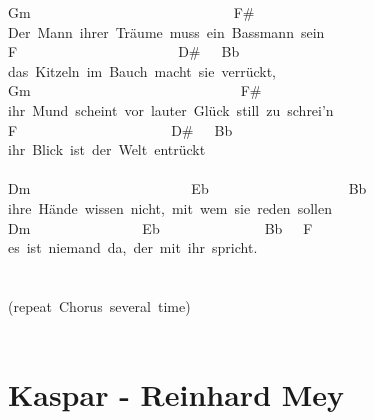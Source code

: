\documentclass[]{book}
\let\stdsection\section
\renewcommand\section{\clearpage\stdsection}
\begin{document}
Gm~~~~~~~~~~~~~~~~~~~~~~~~~~~~~F\#\\
Der~Mann~ihrer~Träume~muss~ein~Bassmann~sein\\
\hspace*{0.333em}\hspace*{0.333em}\hspace*{0.333em}\hspace*{0.333em}\hspace*{0.333em}\hspace*{0.333em}\hspace*{0.333em}F~~~~~~~~~~~~~~~~~~~~~~~D\#~~~Bb\\
das~Kitzeln~im~Bauch~macht~sie~verrückt,\\
\hspace*{0.333em}\hspace*{0.333em}Gm~~~~~~~~~~~~~~~~~~~~~~~~~~~~~~F\#\\
ihr~Mund~scheint~vor~lauter~Glück~still~zu~schrei'n\\
\hspace*{0.333em}\hspace*{0.333em}F~~~~~~~~~~~~~~~~~~~~~~D\#~~~Bb\\
ihr~Blick~ist~der~Welt~entrückt\\
~\\
\hspace*{0.333em}\hspace*{0.333em}\hspace*{0.333em}\hspace*{0.333em}Dm~~~~~~~~~~~~~~~~~~~~~~~Eb~~~~~~~~~~~~~~~~~~~~Bb\\
ihre~Hände~wissen~nicht,~mit~wem~sie~reden~sollen\\
\hspace*{0.333em}\hspace*{0.333em}\hspace*{0.333em}\hspace*{0.333em}Dm~~~~~~~~~~~~~~~~Eb~~~~~~~~~~~~~~~Bb~~~F\\
es~ist~niemand~da,~der~mit~ihr~spricht.\\
~\\
~\\
(repeat~Chorus~several~time)\\
~\\

\hypertarget{kaspar---reinhard-mey}{%
\section{Kaspar - Reinhard Mey}\label{kaspar---reinhard-mey}}
\end{document}

